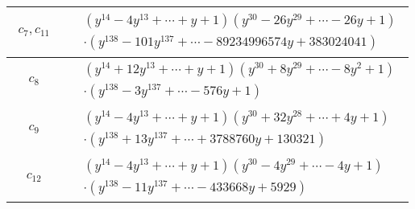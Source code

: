 \documentclass[1p]{elsarticle_modified}
\theoremstyle{definition}
\begin{document}
\begin{tabular}{m{50pt}|m{274pt}}
\hline $$\begin{aligned}c_{7},c_{11}\end{aligned}$$&$\begin{aligned}
&(y^{14}-4 y^{13}+\cdots+y+1)(y^{30}-26 y^{29}+\cdots-26 y+1)\\
&\cdot(y^{138}-101 y^{137}+\cdots-89234996574 y+383024041)
\end{aligned}$\\
\hline $$\begin{aligned}c_{8}\end{aligned}$$&$\begin{aligned}
&(y^{14}+12 y^{13}+\cdots+y+1)(y^{30}+8 y^{29}+\cdots-8 y^2+1)\\
&\cdot(y^{138}-3 y^{137}+\cdots-576 y+1)
\end{aligned}$\\
\hline $$\begin{aligned}c_{9}\end{aligned}$$&$\begin{aligned}
&(y^{14}-4 y^{13}+\cdots+y+1)(y^{30}+32 y^{28}+\cdots+4 y+1)\\
&\cdot(y^{138}+13 y^{137}+\cdots+3788760 y+130321)
\end{aligned}$\\
\hline $$\begin{aligned}c_{12}\end{aligned}$$&$\begin{aligned}
&(y^{14}-4 y^{13}+\cdots+y+1)(y^{30}-4 y^{29}+\cdots-4 y+1)\\
&\cdot(y^{138}-11 y^{137}+\cdots-433668 y+5929)
\end{aligned}$\\
\hline
\end{tabular}
\vskip 2pc
\end{document}
